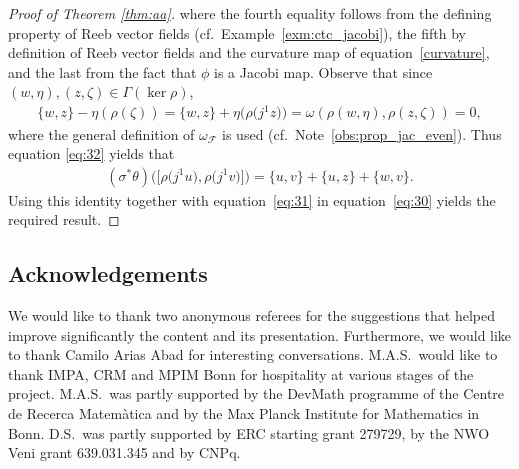 \documentclass[pdftex]{sigma}
\numberwithin{equation}{section}
\begin{document}
\begin{proof}[Proof of Theorem \ref{thm:aa}]
where the fourth equality follows from the def\/ining property of Reeb vector f\/ields (cf.\ Example~\ref{exm:ctc_jacobi}), the f\/ifth by def\/inition of Reeb vector f\/ields and the curvature map of equation~\eqref{curvature}, and the last from the fact that $\phi$ is a Jacobi map. Observe that since $(w,\eta),(z,\zeta) \in \Gamma(\ker \rho)$,
\begin{gather*}
 \{w,z\} - \eta (\rho(\zeta)) = \{w,z\} + \eta\big(\rho\big(j^1z\big)\big) = \omega (\rho(w,\eta),\rho(z,\zeta)) = 0,
\end{gather*}
where the general def\/inition of $\omega_{\mathcal{F}}$ is used (cf.\ Note~\ref{obs:prop_jac_even}). Thus equation \eqref{eq:32} yields that
\begin{gather*}
(\sigma^*\theta)\big(\big[\rho\big(j^1u\big), \rho\big(j^1v\big)\big]\big) = \{u,v\} + \{u,z\} + \{w,v\}.
\end{gather*}
Using  this identity together with equation~\eqref{eq:31} in equation~\eqref{eq:30} yields the required result.
\end{proof}

\subsection*{Acknowledgements}
We would like to thank two anonymous referees for the suggestions that helped improve signif\/icantly the content and its presentation. Furthermore, we would like to thank Camilo Arias Abad for interesting conversations. M.A.S.\ would like to thank IMPA, CRM and MPIM Bonn for hospitality at various stages of the project. M.A.S.\ was partly supported by the DevMath programme of the Centre de Recerca Matem\`atica and by the Max Planck Institute for Mathematics in Bonn. D.S.\ was partly supported by ERC starting grant 279729, by the NWO Veni grant 639.031.345 and by CNPq.
\end{document}
